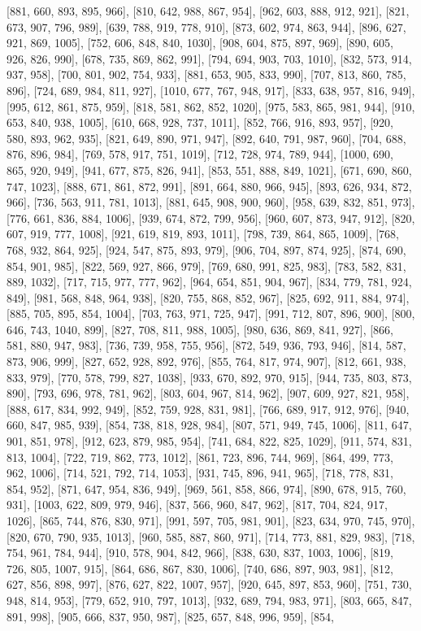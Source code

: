 [881, 660, 893, 895, 966], [810, 642, 988, 867, 954], [962, 603, 888, 912, 921], [821, 673, 907, 796, 989], [639, 788, 919, 778, 910], [873, 602, 974, 863, 944], [896, 627, 921, 869, 1005], [752, 606, 848, 840, 1030], [908, 604, 875, 897, 969], [890, 605, 926, 826, 990], [678, 735, 869, 862, 991], [794, 694, 903, 703, 1010], [832, 573, 914, 937, 958], [700, 801, 902, 754, 933], [881, 653, 905, 833, 990], [707, 813, 860, 785, 896], [724, 689, 984, 811, 927], [1010, 677, 767, 948, 917], [833, 638, 957, 816, 949], [995, 612, 861, 875, 959], [818, 581, 862, 852, 1020], [975, 583, 865, 981, 944], [910, 653, 840, 938, 1005], [610, 668, 928, 737, 1011], [852, 766, 916, 893, 957], [920, 580, 893, 962, 935], [821, 649, 890, 971, 947], [892, 640, 791, 987, 960], [704, 688, 876, 896, 984], [769, 578, 917, 751, 1019], [712, 728, 974, 789, 944], [1000, 690, 865, 920, 949], [941, 677, 875, 826, 941], [853, 551, 888, 849, 1021], [671, 690, 860, 747, 1023], [888, 671, 861, 872, 991], [891, 664, 880, 966, 945], [893, 626, 934, 872, 966], [736, 563, 911, 781, 1013], [881, 645, 908, 900, 960], [958, 639, 832, 851, 973], [776, 661, 836, 884, 1006], [939, 674, 872, 799, 956], [960, 607, 873, 947, 912], [820, 607, 919, 777, 1008], [921, 619, 819, 893, 1011], [798, 739, 864, 865, 1009], [768, 768, 932, 864, 925], [924, 547, 875, 893, 979], [906, 704, 897, 874, 925], [874, 690, 854, 901, 985], [822, 569, 927, 866, 979], [769, 680, 991, 825, 983], [783, 582, 831, 889, 1032], [717, 715, 977, 777, 962], [964, 654, 851, 904, 967], [834, 779, 781, 924, 849], [981, 568, 848, 964, 938], [820, 755, 868, 852, 967], [825, 692, 911, 884, 974], [885, 705, 895, 854, 1004], [703, 763, 971, 725, 947], [991, 712, 807, 896, 900], [800, 646, 743, 1040, 899], [827, 708, 811, 988, 1005], [980, 636, 869, 841, 927], [866, 581, 880, 947, 983], [736, 739, 958, 755, 956], [872, 549, 936, 793, 946], [814, 587, 873, 906, 999], [827, 652, 928, 892, 976], [855, 764, 817, 974, 907], [812, 661, 938, 833, 979], [770, 578, 799, 827, 1038], [933, 670, 892, 970, 915], [944, 735, 803, 873, 890], [793, 696, 978, 781, 962], [803, 604, 967, 814, 962], [907, 609, 927, 821, 958], [888, 617, 834, 992, 949], [852, 759, 928, 831, 981], [766, 689, 917, 912, 976], [940, 660, 847, 985, 939], [854, 738, 818, 928, 984], [807, 571, 949, 745, 1006], [811, 647, 901, 851, 978], [912, 623, 879, 985, 954], [741, 684, 822, 825, 1029], [911, 574, 831, 813, 1004], [722, 719, 862, 773, 1012], [861, 723, 896, 744, 969], [864, 499, 773, 962, 1006], [714, 521, 792, 714, 1053], [931, 745, 896, 941, 965], [718, 778, 831, 854, 952], [871, 647, 954, 836, 949], [969, 561, 858, 866, 974], [890, 678, 915, 760, 931], [1003, 622, 809, 979, 946], [837, 566, 960, 847, 962], [817, 704, 824, 917, 1026], [865, 744, 876, 830, 971], [991, 597, 705, 981, 901], [823, 634, 970, 745, 970], [820, 670, 790, 935, 1013], [960, 585, 887, 860, 971], [714, 773, 881, 829, 983], [718, 754, 961, 784, 944], [910, 578, 904, 842, 966], [838, 630, 837, 1003, 1006], [819, 726, 805, 1007, 915], [864, 686, 867, 830, 1006], [740, 686, 897, 903, 981], [812, 627, 856, 898, 997], [876, 627, 822, 1007, 957], [920, 645, 897, 853, 960], [751, 730, 948, 814, 953], [779, 652, 910, 797, 1013], [932, 689, 794, 983, 971], [803, 665, 847, 891, 998], [905, 666, 837, 950, 987], [825, 657, 848, 996, 959], [854, 